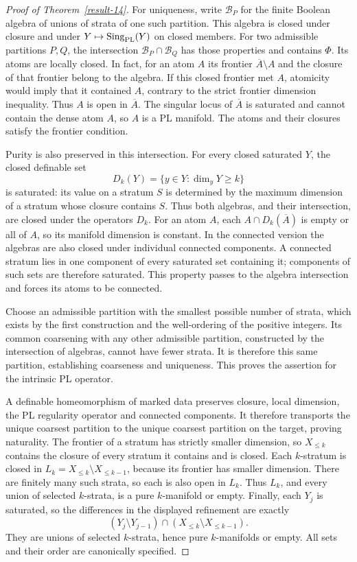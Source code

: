 \documentclass[11pt,a4paper]{article}
\theoremstyle{definition}
\begin{document}
\begin{proof}[Proof of Theorem~\ref{result-14}]
For uniqueness, write $\mathcal B_P$ for the finite Boolean
algebra of unions of strata of one such partition. This algebra is
closed under closure and under $Y\mapsto\operatorname{Sing}_{\rm PL}(Y)$
on closed members. For two admissible partitions $P,Q$, the
intersection $\mathcal B_P\cap\mathcal B_Q$ has those properties
and contains $\Phi$. Its atoms are locally closed. In fact, for an
atom $A$ its frontier $\overline A\setminus A$ and the closure of
that frontier belong to the algebra. If this closed frontier met
$A$, atomicity would imply that it contained $A$, contrary to
the strict frontier dimension inequality. Thus $A$ is open in
$\overline A$. The singular locus of $\overline A$ is saturated
and cannot contain the dense atom $A$, so $A$ is a PL manifold.
The atoms and their closures satisfy the frontier condition.

Purity is also preserved in this intersection. For every closed
saturated $Y$, the closed definable set
\[
 D_k(Y)=\{y\in Y:\dim_yY\ge k\}
\]
is saturated: its value on a stratum $S$ is determined by the
maximum dimension of a stratum whose closure contains $S$.
Thus both algebras, and their intersection, are closed under the
operators $D_k$. For an atom $A$, each $A\cap D_k(\overline A)$
is empty or all of $A$, so its manifold dimension is constant.
In the connected version the algebras are also closed under
individual connected components. A connected stratum lies in one
component of every saturated set containing it; components of such
sets are therefore saturated. This property passes to the algebra
intersection and forces its atoms to be connected.

Choose an admissible partition with the smallest possible number
of strata, which exists by the first construction and the
well-ordering of the positive integers. Its common coarsening with
any other admissible partition, constructed by the intersection
of algebras, cannot have fewer strata. It is therefore this same
partition, establishing coarseness and uniqueness. This proves the assertion for the intrinsic PL operator.

A definable homeomorphism of marked data preserves closure, local
dimension, the PL regularity operator and connected components.
It therefore transports the unique coarsest partition to the
unique coarsest partition on the target, proving naturality.
The frontier of a stratum has strictly smaller dimension, so
$X_{\le k}$ contains the closure of every stratum it contains
and is closed. Each $k$-stratum is closed in
$L_k=X_{\le k}\setminus X_{\le k-1}$, because its frontier
has smaller dimension. There are finitely many such strata,
so each is also open in $L_k$. Thus $L_k$, and every union
of selected $k$-strata, is a pure $k$-manifold or empty.
Finally, each $Y_j$ is saturated, so the
differences in the displayed refinement are exactly
\[
 (Y_j\setminus Y_{j-1})\cap
 (X_{\le k}\setminus X_{\le k-1}).
\]
They are unions of selected $k$-strata, hence pure $k$-manifolds
or empty. All sets and their order are canonically specified.
\end{proof}
\end{document}
